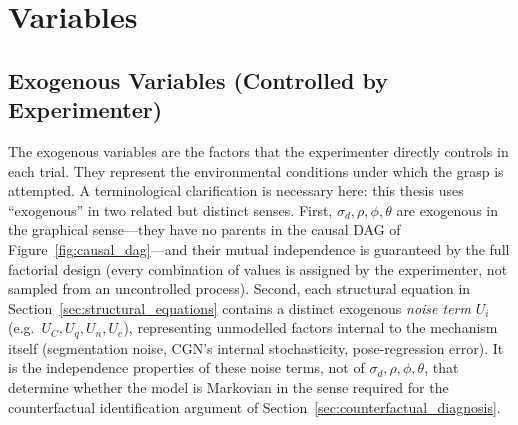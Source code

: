 \documentclass[11pt,a4paper]{report}
\begin{document}
\section{Variables}
\label{sec:variables}

\subsection{Exogenous Variables (Controlled by Experimenter)}

The exogenous variables are the factors that the experimenter directly controls in each trial. They represent the environmental conditions under which the grasp is attempted. A terminological clarification is necessary here: this thesis uses ``exogenous'' in two related but distinct senses. First, $\sigma_d, \rho, \phi, \theta$ are exogenous in the graphical sense---they have no parents in the causal DAG of Figure~\ref{fig:causal_dag}---and their mutual independence is guaranteed by the full factorial design (every combination of values is assigned by the experimenter, not sampled from an uncontrolled process). Second, each structural equation in Section~\ref{sec:structural_equations} contains a distinct exogenous \emph{noise term} $U_i$ (e.g.\ $U_C, U_q, U_n, U_e$), representing unmodelled factors internal to the mechanism itself (segmentation noise, CGN's internal stochasticity, pose-regression error). It is the independence properties of these noise terms, not of $\sigma_d, \rho, \phi, \theta$, that determine whether the model is Markovian in the sense required for the counterfactual identification argument of Section~\ref{sec:counterfactual_diagnosis}.
\end{document}
